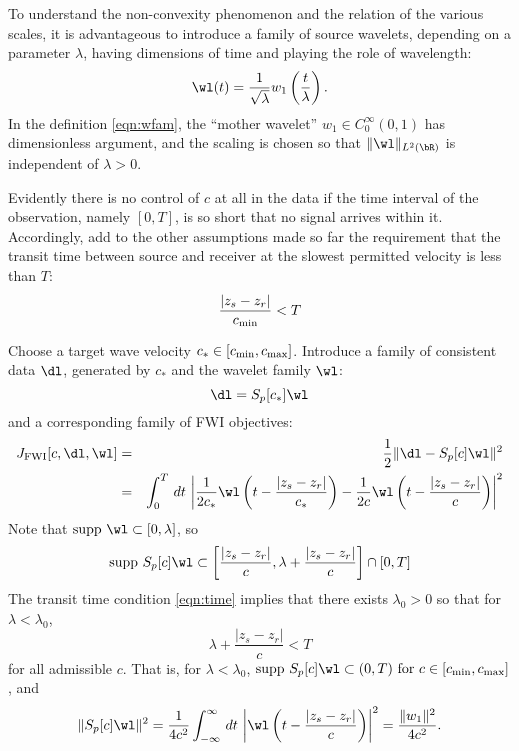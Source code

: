 To understand the non-convexity phenomenon and the
relation of the various scales, it is advantageous to introduce a
family of source wavelets, depending on a parameter $\lambda$, having
dimensions of time and playing
the role of wavelength:
\begin{equation}
  \label{eqn:wfam}
  \wl(t) = \frac{1}{\sqrt{\lambda}}w_1\left(\frac{t}{\lambda}\right).
\end{equation}
In the definition \ref{eqn:wfam}, the ``mother wavelet'' $w_1\in
C_0^{\infty}(0,1)$ has dimensionless argument, and the scaling is chosen so that
$\|\wl\|_{L^2(\bR)}$ is independent of $\lambda>0$.

Evidently there is no control of $c$ at all in the data if the time
interval of the observation, namely $[0,T]$, is so short that no
signal arrives within it. Accordingly, add to the other assumptions
made so far
the requirement that the transit time between source and receiver at
the slowest permitted velocity is less than $T$:
\begin{equation}
   \label{eqn:time}
  \frac{|z_s-z_r|}{c_{\rm min}} < T
\end{equation}

Choose a target wave velocity $c_* \in [c_{\rm min},c_{\rm
  max}]$. Introduce a family of consistent data $\dl$, generated by
$c_*$ and the wavelet family $\wl$:
\begin{equation}
  \label{eqn:dfam}
  \dl = S_p[c_*]\wl
\end{equation}
and a corresponding family of FWI objectives:
\begin{eqnarray}
  J_{\rm FWI}[c,\dl,\wl] &=& \frac{1}{2}\|\dl-S_p[c]\wl\|^2\nonumber\\
  &=&  \int_0^T\,dt\,\left|\frac{1}{2c_*}\wl\left(t-\frac{|z_s-z_r|}{c_*}\right)
    - \frac{1}{2c}\wl\left(t-\frac{|z_s-z_r|}{c}\right)\right|^2
  \label{eqn:fwiexpl}
\end{eqnarray}
Note that $\mbox{supp }\wl \subset [0,\lambda]$, so
\begin{equation}
  \label{eqn:wlsupps}
  \mbox{supp }S_p[c]\wl \subset \left[\frac{|z_s-z_r|}{c},\lambda
    +\frac{|z_s-z_r|}{c}\right] \cap [0,T]
\end{equation}
The transit time condition \ref{eqn:time} implies that there exists
$\lambda_0>0$ so that for $\lambda < \lambda_0$,
\[
  \lambda +\frac{|z_s-z_r|}{c} < T
\]
for all admissible $c$. That is, 
for $\lambda <\lambda_0$, $\mbox{supp }S_p[c]\wl \subset(0,T)\mbox{
  for }c \in [c_{\rm min},c_{\rm max}]$, and 
\begin{equation}
  \label{eqn:constnorm}
  \|S_p[c]\wl\|^2 = \frac{1}{4c^2}\int_{-\infty}^{\infty}\,dt\,\left|
    \wl\left(t-\frac{|z_s-z_r|}{c}\right)\right|^2 =
  \frac{\|w_1\|^2}{4c^2}.
\end{equation}

